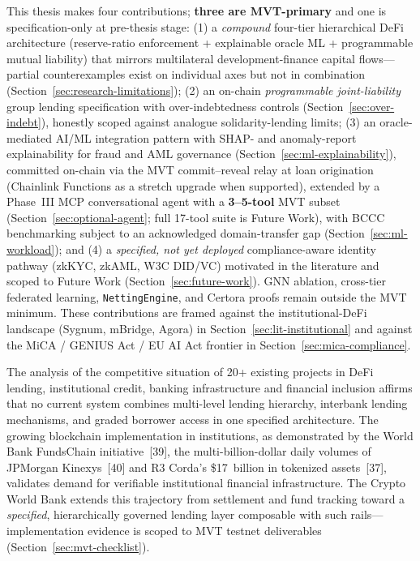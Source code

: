 \documentclass[12pt,a4paper]{report}
\begin{document}
\label{sec:research-contribution}
This thesis makes four contributions; \textbf{three are MVT-primary} and one is specification-only at pre-thesis stage: (1) a \textit{compound} four-tier hierarchical DeFi architecture (reserve-ratio enforcement + explainable oracle ML + programmable mutual liability) that mirrors multilateral development-finance capital flows---partial counterexamples exist on individual axes but not in combination (Section~\ref{sec:research-limitations}); (2) an on-chain \textit{programmable joint-liability} group lending specification with over-indebtedness controls (Section~\ref{sec:over-indebt}), honestly scoped against analogue solidarity-lending limits; (3) an oracle-mediated AI/ML integration pattern with SHAP- and anomaly-report explainability for fraud and AML governance (Section~\ref{sec:ml-explainability}), committed on-chain via the MVT commit--reveal relay at loan origination (Chainlink Functions as a stretch upgrade when supported), extended by a Phase~III MCP conversational agent with a \textbf{3--5-tool} MVT subset (Section~\ref{sec:optional-agent}; full 17-tool suite is Future Work), with BCCC benchmarking subject to an acknowledged domain-transfer gap (Section~\ref{sec:ml-workload}); and (4) a \textit{specified, not yet deployed} compliance-aware identity pathway (zkKYC, zkAML, W3C DID/VC) motivated in the literature and scoped to Future Work (Section~\ref{sec:future-work}). GNN ablation, cross-tier federated learning, \texttt{NettingEngine}, and Certora proofs remain outside the MVT minimum. These contributions are framed against the institutional-DeFi landscape (Sygnum, mBridge, Agora) in Section~\ref{sec:lit-institutional} and against the MiCA / GENIUS Act / EU AI Act frontier in Section~\ref{sec:mica-compliance}.

The analysis of the competitive situation of 20+ existing projects in DeFi lending, institutional credit, banking infrastructure and financial inclusion affirms that no current system combines multi-level lending hierarchy, interbank lending mechanisms, and graded borrower access in one specified architecture. The growing blockchain implementation in institutions, as demonstrated by the World Bank FundsChain initiative~[39], the multi-billion-dollar daily volumes of JPMorgan Kinexys~[40] and R3 Corda's \$17~billion in tokenized assets~[37], validates demand for verifiable institutional financial infrastructure. The Crypto World Bank extends this trajectory from settlement and fund tracking toward a \textit{specified}, hierarchically governed lending layer composable with such rails---implementation evidence is scoped to MVT testnet deliverables (Section~\ref{sec:mvt-checklist}).
\end{document}
